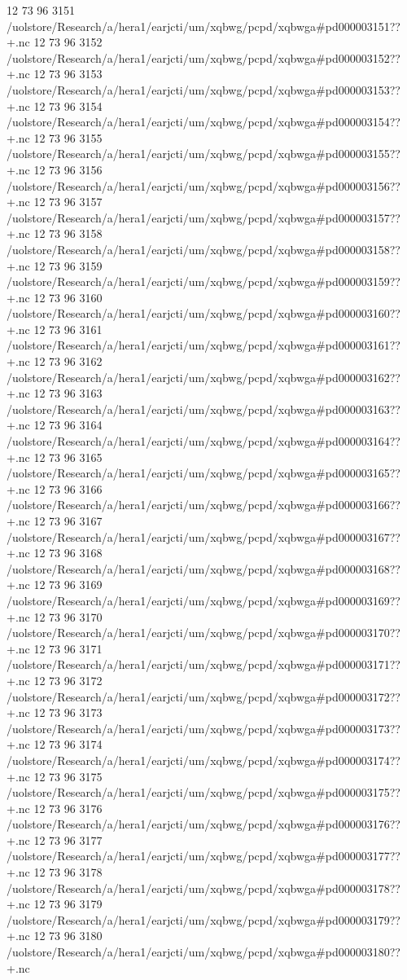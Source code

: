 12 73 96
3151
/uolstore/Research/a/hera1/earjcti/um/xqbwg/pcpd/xqbwga#pd000003151??+.nc
12 73 96
3152
/uolstore/Research/a/hera1/earjcti/um/xqbwg/pcpd/xqbwga#pd000003152??+.nc
12 73 96
3153
/uolstore/Research/a/hera1/earjcti/um/xqbwg/pcpd/xqbwga#pd000003153??+.nc
12 73 96
3154
/uolstore/Research/a/hera1/earjcti/um/xqbwg/pcpd/xqbwga#pd000003154??+.nc
12 73 96
3155
/uolstore/Research/a/hera1/earjcti/um/xqbwg/pcpd/xqbwga#pd000003155??+.nc
12 73 96
3156
/uolstore/Research/a/hera1/earjcti/um/xqbwg/pcpd/xqbwga#pd000003156??+.nc
12 73 96
3157
/uolstore/Research/a/hera1/earjcti/um/xqbwg/pcpd/xqbwga#pd000003157??+.nc
12 73 96
3158
/uolstore/Research/a/hera1/earjcti/um/xqbwg/pcpd/xqbwga#pd000003158??+.nc
12 73 96
3159
/uolstore/Research/a/hera1/earjcti/um/xqbwg/pcpd/xqbwga#pd000003159??+.nc
12 73 96
3160
/uolstore/Research/a/hera1/earjcti/um/xqbwg/pcpd/xqbwga#pd000003160??+.nc
12 73 96
3161
/uolstore/Research/a/hera1/earjcti/um/xqbwg/pcpd/xqbwga#pd000003161??+.nc
12 73 96
3162
/uolstore/Research/a/hera1/earjcti/um/xqbwg/pcpd/xqbwga#pd000003162??+.nc
12 73 96
3163
/uolstore/Research/a/hera1/earjcti/um/xqbwg/pcpd/xqbwga#pd000003163??+.nc
12 73 96
3164
/uolstore/Research/a/hera1/earjcti/um/xqbwg/pcpd/xqbwga#pd000003164??+.nc
12 73 96
3165
/uolstore/Research/a/hera1/earjcti/um/xqbwg/pcpd/xqbwga#pd000003165??+.nc
12 73 96
3166
/uolstore/Research/a/hera1/earjcti/um/xqbwg/pcpd/xqbwga#pd000003166??+.nc
12 73 96
3167
/uolstore/Research/a/hera1/earjcti/um/xqbwg/pcpd/xqbwga#pd000003167??+.nc
12 73 96
3168
/uolstore/Research/a/hera1/earjcti/um/xqbwg/pcpd/xqbwga#pd000003168??+.nc
12 73 96
3169
/uolstore/Research/a/hera1/earjcti/um/xqbwg/pcpd/xqbwga#pd000003169??+.nc
12 73 96
3170
/uolstore/Research/a/hera1/earjcti/um/xqbwg/pcpd/xqbwga#pd000003170??+.nc
12 73 96
3171
/uolstore/Research/a/hera1/earjcti/um/xqbwg/pcpd/xqbwga#pd000003171??+.nc
12 73 96
3172
/uolstore/Research/a/hera1/earjcti/um/xqbwg/pcpd/xqbwga#pd000003172??+.nc
12 73 96
3173
/uolstore/Research/a/hera1/earjcti/um/xqbwg/pcpd/xqbwga#pd000003173??+.nc
12 73 96
3174
/uolstore/Research/a/hera1/earjcti/um/xqbwg/pcpd/xqbwga#pd000003174??+.nc
12 73 96
3175
/uolstore/Research/a/hera1/earjcti/um/xqbwg/pcpd/xqbwga#pd000003175??+.nc
12 73 96
3176
/uolstore/Research/a/hera1/earjcti/um/xqbwg/pcpd/xqbwga#pd000003176??+.nc
12 73 96
3177
/uolstore/Research/a/hera1/earjcti/um/xqbwg/pcpd/xqbwga#pd000003177??+.nc
12 73 96
3178
/uolstore/Research/a/hera1/earjcti/um/xqbwg/pcpd/xqbwga#pd000003178??+.nc
12 73 96
3179
/uolstore/Research/a/hera1/earjcti/um/xqbwg/pcpd/xqbwga#pd000003179??+.nc
12 73 96
3180
/uolstore/Research/a/hera1/earjcti/um/xqbwg/pcpd/xqbwga#pd000003180??+.nc
